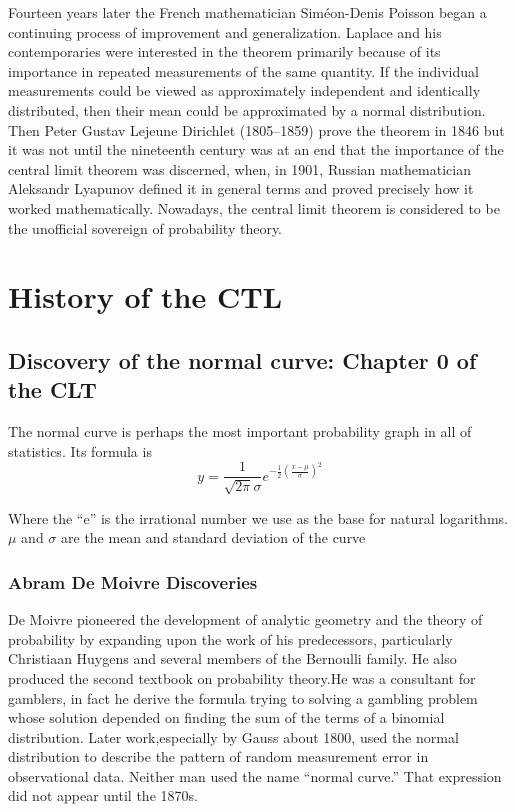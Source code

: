\documentclass{article}
\begin{document}
Fourteen years later the French mathematician Siméon-Denis Poisson began a continuing process of improvement and generalization.
Laplace and his contemporaries were interested in the theorem primarily because of its importance in repeated measurements of the same quantity. If the individual measurements could be viewed as approximately independent and identically distributed, then their mean could be approximated by a normal distribution.
Then Peter Gustav Lejeune Dirichlet (1805–1859) prove the theorem in 1846
but it was not until the nineteenth century was at an end that the importance of the central limit theorem was discerned, when, in 1901, Russian mathematician Aleksandr Lyapunov defined it in general terms and proved precisely how it worked mathematically.
Nowadays, the central limit theorem is considered to be the unofficial sovereign of probability theory.


\section{History of the CTL }

\subsection{Discovery of the normal curve: Chapter 0 of the CLT}
The normal curve is perhaps the most important probability graph in all of statistics.
Its formula is 
\[  y=\frac{1}{\sqrt{2\pi}\sigma}e^{-\frac{1}{2}(\frac{x-\mu}{\sigma})^2  }   \]

 Where the  “e”  is the irrational number we use as the base for natural logarithms. $ \mu $ and $ \sigma $ are
the mean and standard deviation of the curve

\subsubsection{Abram De Moivre Discoveries}
De Moivre pioneered the development of analytic geometry and the theory of probability by expanding upon the work of his predecessors, particularly Christiaan Huygens and several members of the Bernoulli family\cite{DeMoivreDiscoveryNormalCurve}.
He also produced the second textbook on probability theory.He was a consultant for  gamblers, in fact he derive the formula trying to  solving a gambling
problem whose solution depended on finding the sum of the terms of a binomial distribution. Later work,especially by Gauss about 1800, used the normal distribution to describe the pattern of random
measurement error in observational data. Neither man used the name “normal curve.” That expression did not appear until the 1870s.
\end{document}
